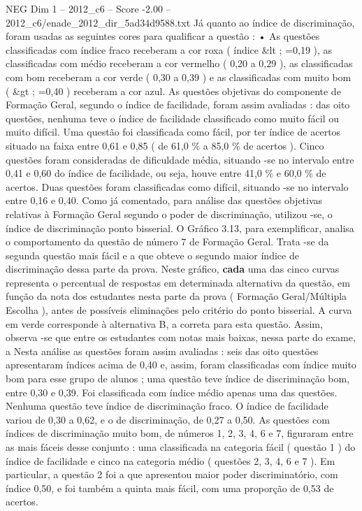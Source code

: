 \begin{textsample}{NEG Dim 1 – 2012\_c6 – Score -2.00 – 2012\_c6/enade\_2012\_dir\_5ad34d9588.txt}
Já quanto ao índice de discriminação, foram usadas as seguintes cores para qualificar a questão : • As questões classificadas com índice fraco receberam a cor roxa ( índice \&lt ; =0,19 ), as classificadas com médio receberam a cor vermelho ( 0,20 a 0,29 ), as classificadas com bom receberam a cor verde ( 0,30 a 0,39 ) e as classificadas com muito bom ( \&gt ; =0,40 ) receberam a cor azul.
As questões objetivas do componente de Formação Geral, segundo o índice de facilidade, foram assim avaliadas : das oito questões, nenhuma teve o índice de facilidade classificado como muito fácil ou muito difícil.
Uma questão foi classificada como fácil, por ter índice de acertos situado na faixa entre 0,61 e 0,85 ( de 61,0 \% a 85,0 \% de acertos ).
Cinco questões foram consideradas de dificuldade média, situando -se no intervalo entre 0,41 e 0,60 do índice de facilidade, ou seja, houve entre 41,0 \% e 60,0 \% de acertos.
Duas questões foram classificadas como difícil, situando -se no intervalo entre 0,16 e 0,40.
Como já comentado, para análise das questões objetivas relativas à Formação Geral segundo o poder de discriminação, utilizou -se, o índice de discriminação ponto bisserial.
O Gráfico 3.13, para exemplificar, analisa o comportamento da questão de número 7 de Formação Geral.
Trata -se da segunda questão mais fácil e a que obteve o segundo maior índice de discriminação dessa parte da prova.
Neste gráfico, \textbf{cada} uma das cinco curvas representa o percentual de respostas em determinada alternativa da questão, em função da nota dos estudantes nesta parte da prova ( Formação Geral/Múltipla Escolha ), antes de possíveis eliminações pelo critério do ponto bisserial.
A curva em verde corresponde à alternativa B, a correta para esta questão.
Assim, observa -se que entre os estudantes com notas mais baixas, nessa parte do exame, a Nesta análise as questões foram assim avaliadas : seis das oito questões apresentaram índices acima de 0,40 e, assim, foram classificadas com índice muito bom para esse grupo de alunos ; uma questão teve índice de discriminação bom, entre 0,30 e 0,39.
Foi classificada com índice médio apenas uma das questões.
Nenhuma questão teve índice de discriminação fraco.
O índice de facilidade variou de 0,30 a 0,62, e o de discriminação, de 0,27 a 0,50.
As questões com índices de discriminação muito bom, de números 1, 2, 3, 4, 6 e 7, figuraram entre as mais fáceis desse conjunto : uma classificada na categoria fácil ( questão 1 ) do índice de facilidade e cinco na categoria médio ( questões 2, 3, 4, 6 e 7 ).
Em particular, a questão 2 foi a que apresentou maior poder discriminatório, com índice 0,50, e foi também a quinta mais fácil, com uma proporção de 0,53 de acertos.

\end{textsample}
